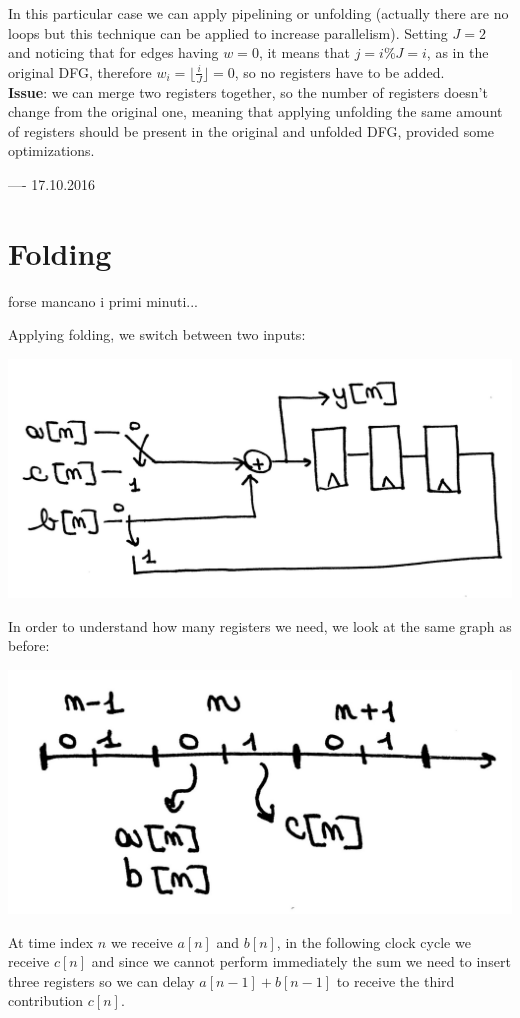 In this particular case we can apply pipelining or unfolding (actually there are no loops but this technique can be applied to increase parallelism). Setting $J=2$ and noticing that for edges having $w=0$, it means that $j=i \% J= i$, as in the original DFG, therefore $w_i=\lfloor \frac{i}{J} \rfloor=0$, so no registers have to be added.\\

\textbf{Issue}: we can merge two registers together, so the number of registers doesn't change from the original one, meaning that applying unfolding the same amount of registers should be present in the original and unfolded DFG, provided some optimizations.


---- 17.10.2016
\section{Folding}
forse mancano i primi minuti...


Applying folding, we switch between two inputs:
\begin{center}
  \includegraphics[width=0.6\linewidth]{img/img1/30}
\end{center}
In order to understand how many registers we need, we look at the same graph as before:
\begin{center}
  \includegraphics[width=0.6\linewidth]{img/img1/31}
\end{center}

At time index $n$ we receive $a[n]$ and $b[n]$, in the following clock cycle we receive $c[n]$ and since we cannot perform immediately the sum we need to insert three registers so we can delay $a[n-1]+b[n-1]$ to receive the third contribution $c[n]$.\\

